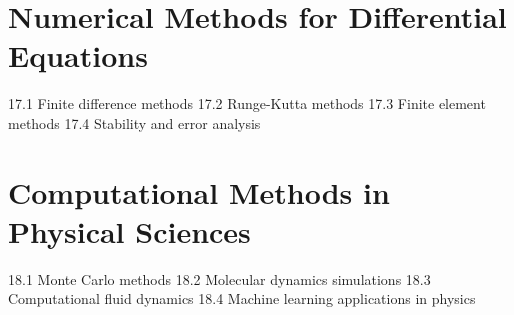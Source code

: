 \section{Numerical Methods for Differential Equations}
17.1 Finite difference methods
17.2 Runge-Kutta methods
17.3 Finite element methods
17.4 Stability and error analysis
\section{Computational Methods in Physical Sciences}
18.1 Monte Carlo methods
18.2 Molecular dynamics simulations
18.3 Computational fluid dynamics
18.4 Machine learning applications in physics
